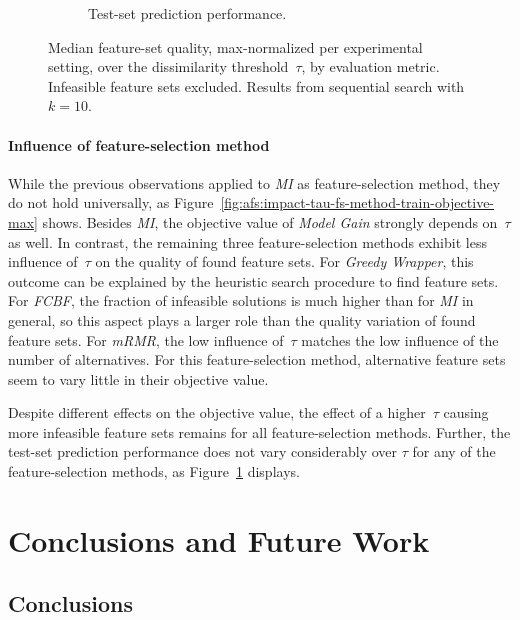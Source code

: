 \documentclass{article}
\theoremstyle{definition}
\begin{document}
\begin{figure}[htb]
\begin{subfigure}[t]{0.48\textwidth}
		\caption{Test-set prediction performance.}
		\label{fig:afs:impact-tau-fs-method-decision-tree-test-mcc-max}
	\end{subfigure}
	\caption{
		Median feature-set quality, max-normalized per experimental setting, over the dissimilarity threshold~$\tau$, by evaluation metric.
		Infeasible feature sets excluded.
		Results from sequential search with $k=10$.
	}
	\label{fig:afs:impact-tau-fs-method-quality}
\end{figure}

\paragraph{Influence of feature-selection method}

While the previous observations applied to \emph{MI} as feature-selection method, they do not hold universally, as Figure~\ref{fig:afs:impact-tau-fs-method-train-objective-max} shows.
Besides \emph{MI}, the objective value of \emph{Model Gain} strongly depends on~$\tau$ as well.
In contrast, the remaining three feature-selection methods exhibit less influence of~$\tau$ on the quality of found feature sets.
For \emph{Greedy Wrapper}, this outcome can be explained by the heuristic search procedure to find feature sets.
For \emph{FCBF}, the fraction of infeasible solutions is much higher than for \emph{MI} in general, so this aspect plays a larger role than the quality variation of found feature sets.
For \emph{mRMR}, the low influence of~$\tau$ matches the low influence of the number of alternatives.
For this feature-selection method, alternative feature sets seem to vary little in their objective value.

Despite different effects on the objective value, the effect of a higher~$\tau$ causing more infeasible feature sets remains for all feature-selection methods.
Further, the test-set prediction performance does not vary considerably over $\tau$ for any of the feature-selection methods, as Figure~\ref{fig:afs:impact-tau-fs-method-decision-tree-test-mcc-max} displays.

\section{Conclusions and Future Work}
\label{sec:afs:conclusion}

\subsection{Conclusions}
\end{document}
